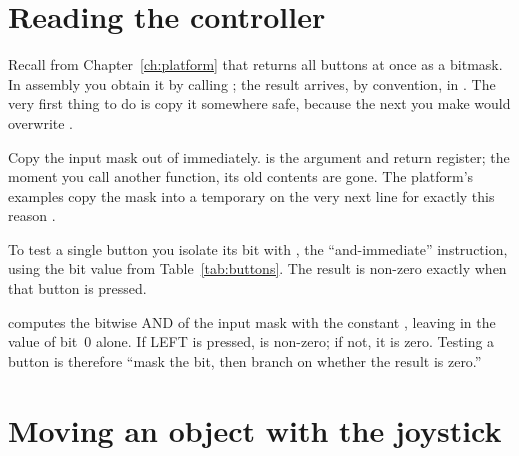 \section{Reading the controller}

Recall from Chapter~\ref{ch:platform} that \prg returns all buttons at once as a
bitmask. In assembly you obtain it by calling ; the
result arrives, by convention, in . The very first thing to do is copy it
somewhere safe, because the next  you make would overwrite .



\begin{prgwarn}
Copy the input mask out of  immediately.  is the argument and
return register; the moment you call another function, its old contents are gone.
The platform's examples copy the mask into a temporary on the very next line for
exactly this reason \citep{prg32tutorialascii}.
\end{prgwarn}

To test a single button you isolate its bit with , the
``and-immediate'' instruction, using the bit value from
Table~\ref{tab:buttons}. The result is non-zero exactly when that button is
pressed.



\begin{prgconcept}
 computes the bitwise AND of the input mask with the
constant , leaving in  the value of bit~0 alone. If LEFT is
pressed,  is non-zero; if not, it is zero. Testing a button is therefore
``mask the bit, then branch on whether the result is zero.''
\end{prgconcept}

\section{Moving an object with the joystick}

